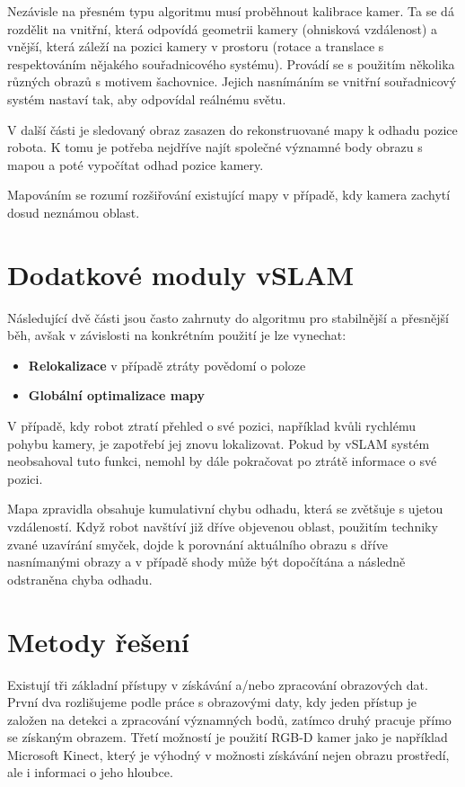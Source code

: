 \documentclass[12pt,a4paper]{report}
\begin{document}
Nezávisle na přesném typu algoritmu musí proběhnout kalibrace kamer. Ta se dá rozdělit na vnitřní, která odpovídá geometrii kamery (ohnisková vzdálenost) a vnější, která záleží na pozici kamery v prostoru (rotace a translace s respektováním nějakého souřadnicového systému). Provádí se s použitím několika různých obrazů s motivem šachovnice. Jejich nasnímáním se vnitřní souřadnicový systém nastaví tak, aby odpovídal reálnému světu.

V další části je sledovaný obraz zasazen do rekonstruované mapy k odhadu pozice robota. K tomu je potřeba nejdříve najít společné významné body obrazu s mapou a poté vypočítat odhad pozice kamery.

Mapováním se rozumí rozšiřování existující mapy v případě, kdy kamera zachytí dosud neznámou oblast.

\section*{Dodatkové moduly vSLAM}
Následující dvě části jsou často zahrnuty do algoritmu pro stabilnější a přesnější běh, avšak v závislosti na konkrétním použití je lze vynechat:
\begin{itemize}
\item \textbf{Relokalizace} v případě ztráty povědomí o poloze
\item \textbf{Globální optimalizace mapy}
\end{itemize}

V případě, kdy robot ztratí přehled o své pozici, například kvůli rychlému pohybu kamery, je zapotřebí jej znovu lokalizovat. Pokud by vSLAM systém neobsahoval tuto funkci, nemohl by dále pokračovat po ztrátě informace o své pozici.

Mapa zpravidla obsahuje kumulativní chybu odhadu, která se zvětšuje s ujetou \linebreak vzdáleností. Když robot navštíví již dříve objevenou oblast, použitím techniky zvané uzavírání smyček, dojde k porovnání aktuálního obrazu s dříve nasnímanými obrazy a v případě shody může být dopočítána a následně odstraněna chyba odhadu.

\section{Metody řešení}
Existují tři základní přístupy v získávání a/nebo zpracování obrazových dat. První dva rozlišujeme podle práce s obrazovými daty, kdy jeden přístup je založen na detekci a zpracování významných bodů, zatímco druhý pracuje přímo se získaným obrazem. Třetí možností je použití RGB-D kamer jako je například Microsoft Kinect, který je výhodný v možnosti získávání nejen obrazu prostředí, ale i informaci o jeho hloubce. 
\end{document}
